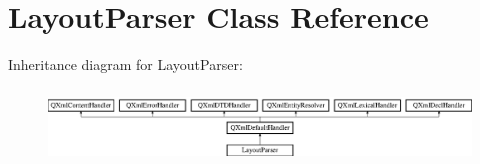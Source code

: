 \hypertarget{class_layout_parser}{}\section{Layout\+Parser Class Reference}
\label{class_layout_parser}
Inheritance diagram for Layout\+Parser\+:\begin{figure}[H]
\begin{center}
\leavevmode
\includegraphics[height=2.014389cm]{class_layout_parser}
\end{center}
\end{figure}
